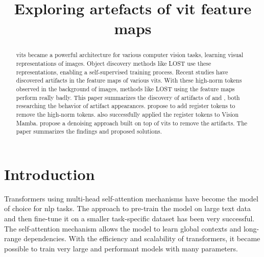 \documentclass[conference]{IEEEtran}
\begin{document}
  \title{Exploring artefacts of \acl{vit} feature maps}

  \author{
    }

  \maketitle

  \begin{abstract}
  \acfp{vit} became a powerful architecture for various computer vision tasks, learning visual representations of images. Object discovery methods like LOST \cite{lost} use these representations, enabling a self-supervised training process. Recent studies have discovered artifacts in the feature maps of various \acp{vit}. With these high-norm tokens observed in the background of images, methods like LOST using the feature maps perform really badly. This paper summarizes the discovery of artifacts of \citeauthor{registers} \cite{registers} and \citeauthor{denoising} \cite{denoising}, both researching the behavior of artifact appearances. \citeauthor{registers} \cite{registers} propose to add register tokens to remove the high-norm tokens. \citeauthor{mamba-needs-registers} \cite{mamba-needs-registers} also successfully applied the register tokens to Vision Mamba. \citeauthor{denoising} \cite{denoising} propose a denoising approach built on top of \acp{vit} to remove the artifacts. The paper summarizes the findings and proposed solutions.
  \end{abstract}


  \IEEEpeerreviewmaketitle

  \section{Introduction}
  \label{sec:introduction}

  Transformers \cite{transformer2017} using multi-head self-attention mechanisms have become the model of choice for \ac{nlp} tasks. The approach to pre-train the model on large text data and then fine-tune it on a smaller task-specific dataset has been very successful. The self-attention mechanism allows the model to learn global contexts and long-range dependencies. With the efficiency and scalability of transformers, it became possible to train very large and performant models with many parameters. \cite{transformer2017} \cite{visiontransformers2021} \cite{vit-state-challenges}
\end{document}
